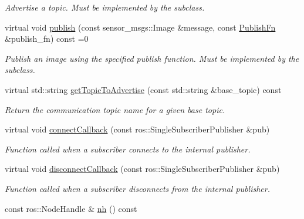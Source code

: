 \begin{DoxyCompactItemize}
\begin{DoxyCompactList}\small\item\em Advertise a topic. Must be implemented by the subclass. \end{DoxyCompactList}\item 
virtual void \hyperlink{classimage__transport_1_1_simple_publisher_plugin_a193470dd32092d13e2284052d4fa359a}{publish} (const sensor\-\_\-msgs\-::\-Image \&message, const \hyperlink{classimage__transport_1_1_simple_publisher_plugin_a01bd11cb3ee6b7ce6715a3b57feadf93}{Publish\-Fn} \&publish\-\_\-fn) const =0
\begin{DoxyCompactList}\small\item\em Publish an image using the specified publish function. Must be implemented by the subclass. \end{DoxyCompactList}\item 
virtual std\-::string \hyperlink{classimage__transport_1_1_simple_publisher_plugin_a46df2b43de62c169d28ac510010d032f}{get\-Topic\-To\-Advertise} (const std\-::string \&base\-\_\-topic) const 
\begin{DoxyCompactList}\small\item\em Return the communication topic name for a given base topic. \end{DoxyCompactList}\item 
virtual void \hyperlink{classimage__transport_1_1_simple_publisher_plugin_a4329bd192aa03ec8b44e52c6bbe91a11}{connect\-Callback} (const ros\-::\-Single\-Subscriber\-Publisher \&pub)
\begin{DoxyCompactList}\small\item\em Function called when a subscriber connects to the internal publisher. \end{DoxyCompactList}\item 
virtual void \hyperlink{classimage__transport_1_1_simple_publisher_plugin_ac02aac90a3a159c1450a298b63a37425}{disconnect\-Callback} (const ros\-::\-Single\-Subscriber\-Publisher \&pub)
\begin{DoxyCompactList}\small\item\em Function called when a subscriber disconnects from the internal publisher. \end{DoxyCompactList}\item 
\hypertarget{classimage__transport_1_1_simple_publisher_plugin_a5f73a993e871242e51671f3cf82d4e1b}{const ros\-::\-Node\-Handle \& \hyperlink{classimage__transport_1_1_simple_publisher_plugin_a5f73a993e871242e51671f3cf82d4e1b}{nh} () const }\label{classimage__transport_1_1_simple_publisher_plugin_a5f73a993e871242e51671f3cf82d4e1b}


\end{DoxyCompactItemize}
